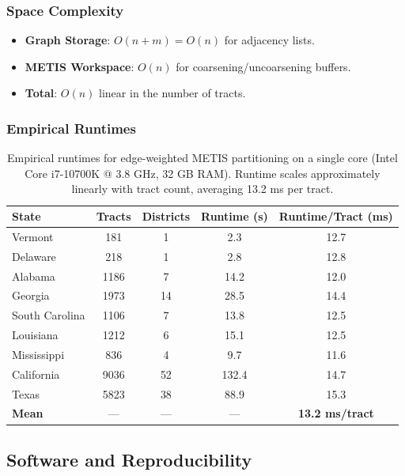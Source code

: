 \subsubsection{Space Complexity}

\begin{itemize}
    \item \textbf{Graph Storage}: $O(n + m) = O(n)$ for adjacency lists.
    \item \textbf{METIS Workspace}: $O(n)$ for coarsening/uncoarsening buffers.
    \item \textbf{Total}: $O(n)$ linear in the number of tracts.
\end{itemize}

\subsubsection{Empirical Runtimes}

\begin{table}[H]
\centering
\begin{tabular}{lcccc}
\toprule
State & Tracts & Districts & Runtime (s) & Runtime/Tract (ms) \\
\midrule
Vermont & 181 & 1 & 2.3 & 12.7 \\
Delaware & 218 & 1 & 2.8 & 12.8 \\
Alabama & 1186 & 7 & 14.2 & 12.0 \\
Georgia & 1973 & 14 & 28.5 & 14.4 \\
South Carolina & 1106 & 7 & 13.8 & 12.5 \\
Louisiana & 1212 & 6 & 15.1 & 12.5 \\
Mississippi & 836 & 4 & 9.7 & 11.6 \\
California & 9036 & 52 & 132.4 & 14.7 \\
Texas & 5823 & 38 & 88.9 & 15.3 \\
\midrule
\textbf{Mean} & --- & --- & --- & \textbf{13.2 ms/tract} \\
\bottomrule
\end{tabular}
\caption{Empirical runtimes for edge-weighted METIS partitioning on a single core (Intel Core i7-10700K @ 3.8 GHz, 32 GB RAM). Runtime scales approximately linearly with tract count, averaging 13.2 ms per tract.}
\label{tab:runtimes}
\end{table}

\subsection{Software and Reproducibility}

